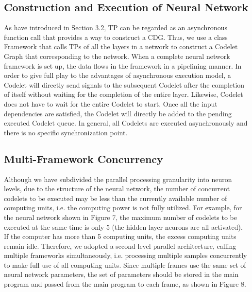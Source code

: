 \subsection{Construction and Execution of Neural Network}
As have introduced in Section 3.2, TP can be regarded as an asynchronous function call that provides a way to construct a CDG. Thus, we use a class Framework that calls TPs of all the layers in a network to construct a Codelet Graph that corresponding to the network. When a complete neural network framework is set up, the data flows in the framework in a pipelining manner.
In order to give full play to the advantages of asynchronous execution model, a Codelet will directly send signals to the subsequent Codelet after the completion of itself without waiting for the completion of the entire layer. Likewise, Codelet does not have to wait for the entire Codelet to start. Once all the input dependencies are satisfied, the Codelet will directly be added to the pending executed Codelet queue. In general, all Codelets are executed asynchronously and there is no specific synchronization point. 

\subsection{Multi-Framework Concurrency}
Although we have subdivided the parallel processing granularity into neuron levels, due to the structure of the neural network, the number of concurrent codelets to be executed may be less than the currently available number of computing units, i.e. the computing power is not fully utilized. For example, for the neural network shown in Figure 7, the maximum number of codelets to be executed at the same time is only 5 (the hidden layer neurons are all activated). If the computer has more than 5 computing units, the excess computing units remain idle. Therefore, we adopted a second-level parallel architecture, calling multiple frameworks simultaneously, i.e. processing multiple samples concurrently to make full use of all computing units. Since multiple frames use the same set of neural network parameters, the set of parameters should be stored in the main program and passed from the main program to each frame, as shown in Figure 8.
 
